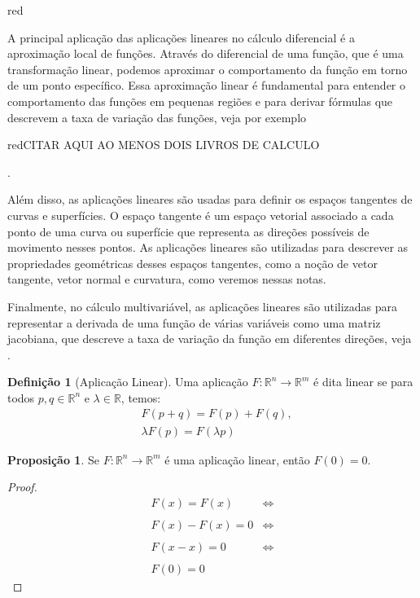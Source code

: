 \documentclass[12pt,leqno,twoside]{amsart}
\theoremstyle{definition}
\newtheorem{proposicao}{Proposição}[section]
\newtheorem{definicao}{Definição}[section]
\begin{document}
\begin{color}{red}
\vspace{0.3cm}

A principal aplicação das aplicações lineares no cálculo diferencial é a aproximação local de funções. Através do diferencial de uma função, que é uma transformação linear, podemos aproximar o comportamento da função em torno de um ponto específico. Essa aproximação linear é fundamental para entender o comportamento das funções em pequenas regiões e para derivar fórmulas que descrevem a taxa de variação das funções, veja por exemplo \begin{color}{red}CITAR AQUI AO MENOS DOIS LIVROS DE CALCULO \end{color}.

\vspace{0.3cm}

Além disso, as aplicações lineares são usadas para definir os espaços tangentes de curvas e superfícies. O espaço tangente é um espaço vetorial associado a cada ponto de uma curva ou superfície que representa as direções possíveis de movimento nesses pontos. As aplicações lineares são utilizadas para descrever as propriedades geométricas desses espaços tangentes, como a noção de vetor tangente, vetor normal e curvatura, como veremos nessas notas.

\vspace{0.3cm}

Finalmente,  no cálculo multivariável, as aplicações lineares são utilizadas para representar a derivada de uma função de várias variáveis como uma matriz jacobiana, que descreve a taxa de variação da função em diferentes direções, veja \cite[Capítulo 5]{E2} .

\vspace{0.3cm}


\begin{definicao}[Aplicação Linear]
	Uma aplicação $F:\mathbb{R}^n \to \mathbb{R}^m$ é dita linear se para todos $p,q \in \mathbb{R}^n$ e $\lambda \in \mathbb{R}$, temos:
	\begin{align*}
		&F(p+q) = F(p)+F(q),\\
		&\lambda F(p) = F(\lambda p)
	\end{align*}
\end{definicao}
\begin{proposicao}
	\label{prop:apl0}
	Se $F:\mathbb{R}^n \to \mathbb{R}^m$ é uma aplicação linear, então $F(0) = 0$.
\end{proposicao}
\begin{proof}
	\begin{align*}
		F(x) = F(x) &\iff \\~\\
		F(x) - F(x) = 0 &\iff\\~\\
		F(x-x) = 0 &\iff \\~\\
		F(0) = 0
	\end{align*}


\end{proof}
\end{color}
\end{document}
